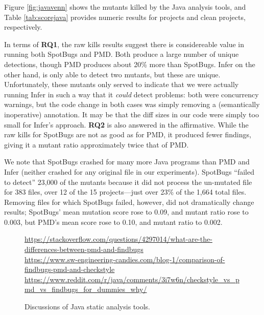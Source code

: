 Figure \ref{fig:javavenn} shows the mutants killed by the Java analysis tools, and Table \ref{tab:scorejava} provides numeric results for projects and clean projects, respectively.

In terms of {\bf RQ1}, the raw kills results suggest there is considereable value in running both SpotBugs and PMD.  Both produce a large number of unique detections, though PMD produces about 20\% more than SpotBugs.
Infer on the other hand, is only able to detect two mutants, but these are unique.  Unfortunately, these mutants only served to indicate that we were actually running Infer in such a way that it \emph{could} detect problems:  both were concurrency warnings, but the code change in both cases was simply removing a (semantically inoperative) {\tt \@Override} annotation.  It may be that the diff sizes in our code were simply too small for Infer's approach.
{\bf RQ2} is also answered in the affirmative.  While the raw kills for SpotBugs are not as good as for PMD, it produced fewer findings, giving it a mutant ratio approximately twice that of PMD.

We note that SpotBugs crashed for many more Java programs than PMD and Infer (neither crashed for any original file in our experiments).  SpotBugs ``failed to detect'' 23,000 of the mutants because it did not process the un-mutated file for 383 files, over 12 of the 15 projects---just over 23\% of the 1,664 total files.  Removing files for which SpotBugs failed, however, did not dramatically change results; SpotBugs' mean mutation score rose to 0.09, and mutant ratio rose to 0.003, but PMD's mean score rose to 0.10, and mutant ratio to 0.002.

\begin{figure}
  {\scriptsize
    \raggedright    
  \url{https://stackoverflow.com/questions/4297014/what-are-the-differences-between-pmd-and-findbugs} \\
  \url{https://www.sw-engineering-candies.com/blog-1/comparison-of-findbugs-pmd-and-checkstyle} \\
  \url{https://www.reddit.com/r/java/comments/3i7w6n/checkstyle_vs_pmd_vs_findbugs_for_dummies_why/} \\
  }
\caption{Discussions of Java static analysis tools.}
\label{fig:blog}
\end{figure}

